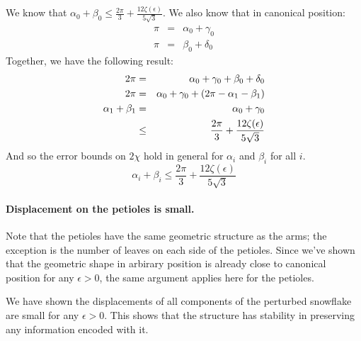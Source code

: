 We know that $\alpha_0 + \beta_0 \leq \frac{2\pi}{3} + \frac{12 \zeta(\epsilon)}{5\sqrt{3}}.$
We also know that in canonical position:
$$ 
\begin{array}{rcl}
\pi &=& \alpha_0 + \gamma_0 \\
\pi &=& \beta_0 + \delta_0
\end{array}
$$
Together, we have the following result:
\begin{eqnarray*}
2\pi &=& \alpha_0 + \gamma_0 + \beta_0 + \delta_0\\
2\pi &=& \alpha_0 + \gamma_0 + \left( 2\pi - \alpha_1 - \beta_1 \right)\\
\alpha_1 + \beta_1&=&\alpha_0 + \gamma_0 \\
&\leq& \frac{2\pi}{3} + \frac{12\zeta(\epsilon)}{5\sqrt{3}}\\
\end{eqnarray*}
And so the error bounds on $2\chi$ hold in general for $\alpha_i$ and $\beta_i$ for all $i$.  
$$\alpha_i + \beta_i \leq \frac{2\pi}{3} + \frac{12\zeta(\epsilon)}{5\sqrt{3}}$$
\paragraph{Displacement on the petioles is small.}
Note that the petioles have the same geometric structure as the arms; the exception is the number of leaves on each side of the petioles. 
Since we've shown that the geometric shape in arbirary position is already close to canonical position for any $\epsilon>0$, the same argument applies here for the petioles.

We have shown the displacements of all components of the perturbed snowflake are small for any $\epsilon > 0$.  
This shows that the structure has stability in preserving any information encoded with it.











